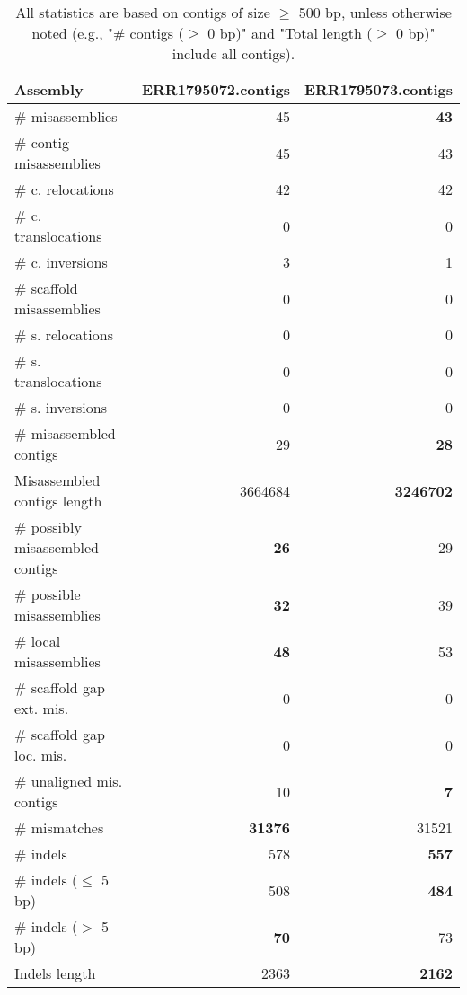 \documentclass[12pt,a4paper]{article}
\begin{document}
\begin{table}[ht]
\begin{center}
\caption{All statistics are based on contigs of size $\geq$ 500 bp, unless otherwise noted (e.g., "\# contigs ($\geq$ 0 bp)" and "Total length ($\geq$ 0 bp)" include all contigs).}
\begin{tabular}{|l*{2}{|r}|}
\hline
Assembly & ERR1795072.contigs & ERR1795073.contigs \\ \hline
\# misassemblies & 45 & {\bf 43} \\ \hline
\hspace{2mm}\# contig misassemblies & 45 & 43 \\ \hline
\hspace{5mm}\# c. relocations & 42 & 42 \\ \hline
\hspace{5mm}\# c. translocations & 0 & 0 \\ \hline
\hspace{5mm}\# c. inversions & 3 & 1 \\ \hline
\hspace{2mm}\# scaffold misassemblies & 0 & 0 \\ \hline
\hspace{5mm}\# s. relocations & 0 & 0 \\ \hline
\hspace{5mm}\# s. translocations & 0 & 0 \\ \hline
\hspace{5mm}\# s. inversions & 0 & 0 \\ \hline
\# misassembled contigs & 29 & {\bf 28} \\ \hline
Misassembled contigs length & 3664684 & {\bf 3246702} \\ \hline
\# possibly misassembled contigs & {\bf 26} & 29 \\ \hline
\hspace{5mm}\# possible misassemblies & {\bf 32} & 39 \\ \hline
\# local misassemblies & {\bf 48} & 53 \\ \hline
\# scaffold gap ext. mis. & 0 & 0 \\ \hline
\# scaffold gap loc. mis. & 0 & 0 \\ \hline
\# unaligned mis. contigs & 10 & {\bf 7} \\ \hline
\# mismatches & {\bf 31376} & 31521 \\ \hline
\# indels & 578 & {\bf 557} \\ \hline
\hspace{5mm}\# indels ($\leq$ 5 bp) & 508 & {\bf 484} \\ \hline
\hspace{5mm}\# indels ($>$ 5 bp) & {\bf 70} & 73 \\ \hline
Indels length & 2363 & {\bf 2162} \\ \hline
\end{tabular}
\end{center}
\end{table}
\end{document}
